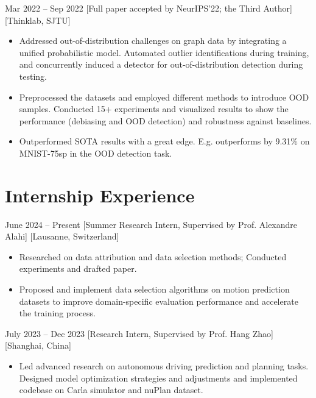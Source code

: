 \documentclass{chicv}
\begin{document}
{Mar 2022 -- Sep 2022}
[Full paper accepted by NeurIPS'22; the Third Author]
[Thinklab, SJTU]

\begin{itemize}
	\item Addressed out-of-distribution challenges on graph data by integrating a unified probabilistic model. Automated outlier identifications during training, and concurrently induced a detector for out-of-distribution detection during testing.
	\item Preprocessed the datasets and employed different methods to introduce OOD samples. Conducted 15+ experiments and visualized results to show the performance (debiasing and OOD detection) and robustness against baselines.
	\item Outperformed SOTA results with a great edge. E.g. outperforms by 9.31\% on MNIST-75sp in the OOD detection task.
\end{itemize}

\section{Internship Experience}
{June 2024 -- Present}
[Summer Research Intern, Supervised by Prof. Alexandre Alahi]
[Lausanne, Switzerland]

\begin{itemize}
	\item Researched on data attribution and data selection methods; Conducted experiments and drafted paper.
	\item Proposed and implement data selection algorithms on motion prediction datasets to improve domain-specific evaluation performance and accelerate the training process.
\end{itemize}

{July 2023 -- Dec 2023}
[Research Intern, Supervised by Prof. Hang Zhao]
[Shanghai, China]

\begin{itemize}
	\item Led advanced research on autonomous driving prediction and planning tasks. Designed model optimization strategies and adjustments and implemented codebase on Carla simulator and nuPlan dataset.
\end{itemize}
\end{document}
